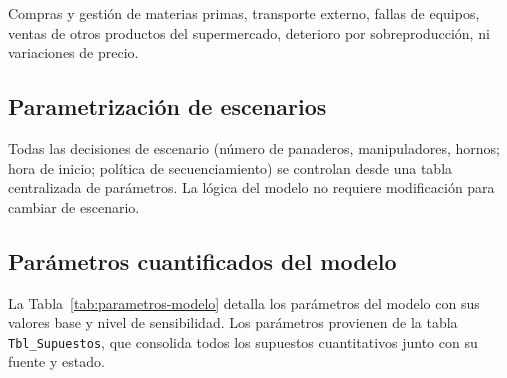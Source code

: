 \documentclass[12pt]{article}
\begin{document}
Compras y gestión de materias primas, transporte externo, fallas de equipos, ventas de otros productos del supermercado, deterioro por sobreproducción, ni variaciones de precio.

\subsection{Parametrización de escenarios}

Todas las decisiones de escenario (número de panaderos, manipuladores, hornos; hora de inicio; política de secuenciamiento) se controlan desde una tabla centralizada de parámetros. La lógica del modelo no requiere modificación para cambiar de escenario.

\subsection{Parámetros cuantificados del modelo}

La Tabla~\ref{tab:parametros-modelo} detalla los parámetros del modelo con sus valores base y nivel de sensibilidad. Los parámetros provienen de la tabla \texttt{Tbl\_Supuestos}, que consolida todos los supuestos cuantitativos junto con su fuente y estado.
\end{document}
